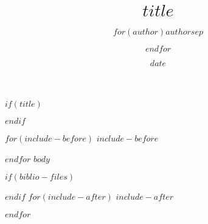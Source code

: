 \documentclass[oneside]{article}
\title{$title$}
\author{$for(author)$$author$$sep$ \and $endfor$}
\date{$date$}
\begin{document}
\fontsize{11}{13}\selectfont
$if(title)$
\maketitle
$endif$

\bigskip

$for(include-before)$
$include-before$

$endfor$
$body$

$if(biblio-files)$


$endif$
$for(include-after)$
$include-after$

$endfor$
\end{document}
